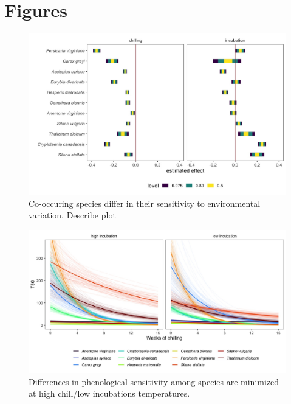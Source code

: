 \documentclass{article}[12pt]
\begin{document}
\section*{Figures}
\begin{figure}[h!]
  \centering
 \includegraphics[width=\textwidth]{..//plots/mus_survival.jpeg}
    \caption{Co-occuring species differ in their sensitivity to environmental variation. Describe plot}
    \label{Fig:emp}
\end{figure}


\begin{figure}[h!]
  \centering
 \includegraphics[width=\textwidth]{..//plots/surv_prieff.jpeg}
    \caption{Differences in phenological sensitivity among species are minimized at high chill/low incubations temperatures.}
    \label{Fig:surv}
\end{figure}
\end{document}
